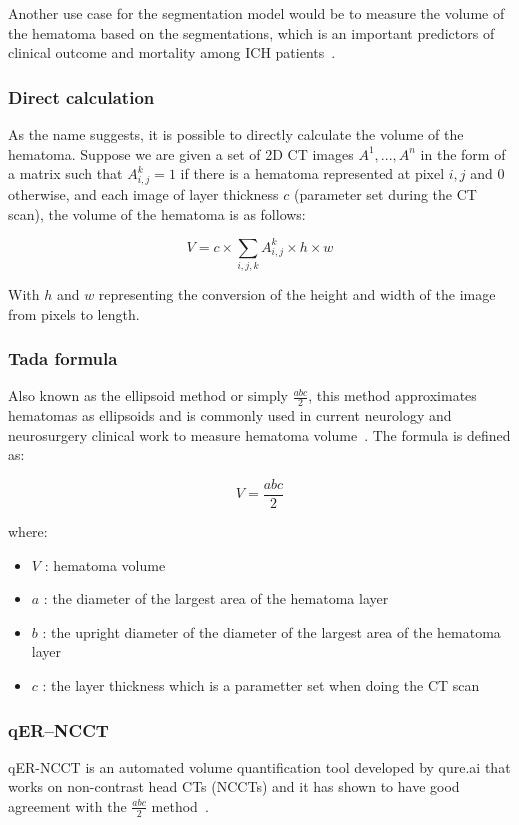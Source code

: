 \documentclass[11pt, journal, a4paper]{IEEEtran}
\begin{document}
Another use case for the segmentation model would be to measure the volume of the hematoma based on the segmentations, which is an important predictors of clinical outcome and mortality among ICH patients~\cite{Broderick_Brott_Duldner_Tomsick_Huster_1993}. 

\subsubsection{Direct calculation}
As the name suggests, it is possible to directly calculate the volume of the hematoma. Suppose we are given a set of 2D CT images $A^1,...,A^n$ in the form of a matrix such that $A^k_{i,j} = 1$ if there is a hematoma represented at pixel $i,j$ and $0$ otherwise, and each image of layer thickness $c$ (parameter set during the CT scan), the volume of the hematoma is as follows:

$$V = c \times \sum_{i,j,k}A^k_{i,j} \times h \times w$$

With $h$ and $w$ representing the conversion of the height and width of the image from pixels to length.

\subsubsection{Tada formula}

Also known as the ellipsoid method or simply $\frac{abc}{2}$, this method approximates hematomas as ellipsoids and is commonly used in current neurology and neurosurgery clinical work to measure hematoma volume~\cite{tada}. The formula is defined as:

$$V = \frac{abc}{2}$$ 

where: 
\begin{itemize}
    \item $V$ : hematoma volume
    \item $a$ : the diameter of the largest area of the hematoma layer
    \item  $b$ : the upright diameter of the diameter of the largest area of the hematoma layer
    \item  $c$ : the layer thickness which is a parametter set when doing the CT scan
\end{itemize}

\subsubsection{qER–NCCT}
qER-NCCT is an automated volume quantification tool developed by qure.ai that works on non-contrast head CTs (NCCTs) and it has shown to have good agreement with the $\frac{abc}{2}$ method~\cite{Hillal_Sultani_Ramgren_Norrving_Wassélius_Ullberg_2022}. 
\end{document}
